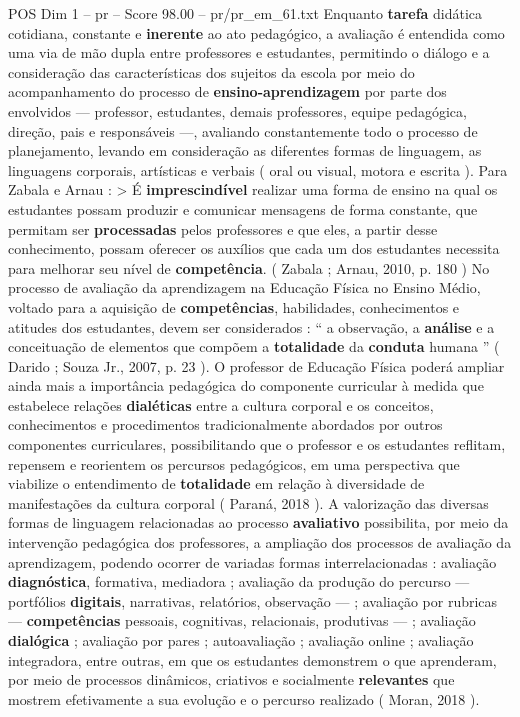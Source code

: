 \begin{textsample}{POS Dim 1 – pr – Score 98.00 – pr/pr\_em\_61.txt}
Enquanto \textbf{tarefa} didática cotidiana, constante e \textbf{inerente} ao ato pedagógico, a avaliação é entendida como uma via de mão dupla entre professores e estudantes, permitindo o diálogo e a consideração das características dos sujeitos da escola por meio do acompanhamento do processo de \textbf{ensino-aprendizagem} por parte dos envolvidos — professor, estudantes, demais professores, equipe pedagógica, direção, pais e responsáveis —, avaliando constantemente todo o processo de planejamento, levando em consideração as diferentes formas de linguagem, as linguagens corporais, artísticas e verbais ( oral ou visual, motora e escrita ).
Para Zabala e Arnau : > É \textbf{imprescindível} realizar uma forma de ensino na qual os estudantes possam produzir e comunicar mensagens de forma constante, que permitam ser \textbf{processadas} pelos professores e que eles, a partir desse conhecimento, possam oferecer os auxílios que cada um dos estudantes necessita para melhorar seu nível de \textbf{competência}. ( Zabala ; Arnau, 2010, p. 180 ) No processo de avaliação da aprendizagem na Educação Física no Ensino Médio, voltado para a aquisição de \textbf{competências}, habilidades, conhecimentos e atitudes dos estudantes, devem ser considerados : “ a observação, a \textbf{análise} e a conceituação de elementos que compõem a \textbf{totalidade} da \textbf{conduta} humana ” ( Darido ; Souza Jr., 2007, p. 23 ).
O professor de Educação Física poderá ampliar ainda mais a importância pedagógica do componente curricular à medida que estabelece relações \textbf{dialéticas} entre a cultura corporal e os conceitos, conhecimentos e procedimentos tradicionalmente abordados por outros componentes curriculares, possibilitando que o professor e os estudantes reflitam, repensem e reorientem os percursos pedagógicos, em uma perspectiva que viabilize o entendimento de \textbf{totalidade} em relação à diversidade de manifestações da cultura corporal ( Paraná, 2018 ).
A valorização das diversas formas de linguagem relacionadas ao processo \textbf{avaliativo} possibilita, por meio da intervenção pedagógica dos professores, a ampliação dos processos de avaliação da aprendizagem, podendo ocorrer de variadas formas interrelacionadas : avaliação \textbf{diagnóstica}, formativa, mediadora ; avaliação da produção do percurso — portfólios \textbf{digitais}, narrativas, relatórios, observação — ; avaliação por rubricas — \textbf{competências} pessoais, cognitivas, relacionais, produtivas — ; avaliação \textbf{dialógica} ; avaliação por pares ; autoavaliação ; avaliação online ; avaliação integradora, entre outras, em que os estudantes demonstrem o que aprenderam, por meio de processos dinâmicos, criativos e socialmente \textbf{relevantes} que mostrem efetivamente a sua evolução e o percurso realizado ( Moran, 2018 ).

\end{textsample}

